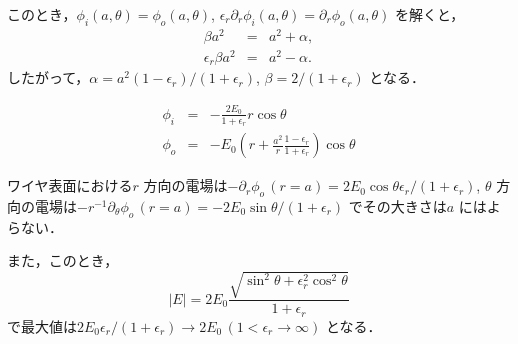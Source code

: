 \documentclass{jsarticle}
\begin{document}
このとき，$\phi_i(a,\theta) = \phi_o(a,\theta)$, $\epsilon_r\partial_r\phi_i(a, \theta) = \partial_r\phi_o(a, \theta)$ を解くと，
\begin{eqnarray}
\beta a^2 &=& a^2 + \alpha, \\
\epsilon_r \beta a^2 &=& a^2 - \alpha.
\end{eqnarray}
したがって，$\alpha = a^2(1-\epsilon_r)/(1+\epsilon_r)$, $\beta = 2/(1+\epsilon_r)$ となる．

\begin{eqnarray}
\phi_i &=& - \frac{2 E_0}{1+\epsilon_r} r \cos\theta \\ 
\phi_o &=& -E_0\left(r + \frac{a^2}{r}\frac{1-\epsilon_r}{1+\epsilon_r}\right) \cos\theta
\end{eqnarray}

ワイヤ表面における$r$ 方向の電場は$-\partial_r\phi_o\,(r = a) = 2E_0\cos\theta\epsilon_r/(1+\epsilon_r)$, $\theta$ 方向の電場は$-r^{-1}\partial_\theta\phi_o\,(r = a) = -2E_0\sin\theta/(1+\epsilon_r)$ でその大きさは$a$ にはよらない．

また，このとき，
\begin{equation}
|E| = 2E_0\frac{\sqrt{\sin^2\theta + \epsilon_r^2\cos^2\theta}}{1 + \epsilon_r}
\end{equation}
で最大値は$2E_0\epsilon_r/(1+\epsilon_r)\to2E_0\,(1<\epsilon_r\to\infty)$ となる．
\end{document}
